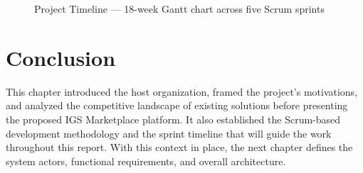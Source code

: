 \begin{figure}[H]
\centering
\resizebox{0.95\textwidth}{!}{}
\caption{Project Timeline --- 18-week Gantt chart across five Scrum sprints}
\label{fig:gantt_timeline}
\end{figure}

\section*{Conclusion}
This chapter introduced the host organization, framed the project's motivations, and analyzed the competitive landscape of existing solutions before presenting the proposed IGS Marketplace platform. It also established the Scrum-based development methodology and the sprint timeline that will guide the work throughout this report. With this context in place, the next chapter defines the system actors, functional requirements, and overall architecture.
